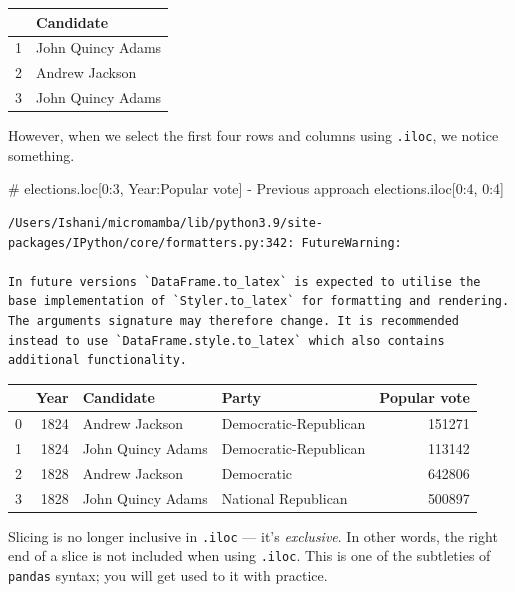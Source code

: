 \documentclass[
  letterpaper,
  DIV=11,
  numbers=noendperiod]{scrreprt}
\newenvironment{Shaded}{\begin{snugshade}}{\end{snugshade}}
\newcommand{\CommentTok}[1]{\textcolor[rgb]{0.37,0.37,0.37}{#1}}
\newcommand{\DecValTok}[1]{\textcolor[rgb]{0.68,0.00,0.00}{#1}}
\newcommand{\NormalTok}[1]{\textcolor[rgb]{0.00,0.23,0.31}{#1}}
\begin{document}
\begin{tabular}{ll}
\toprule
{} &          Candidate \\
\midrule
1 &  John Quincy Adams \\
2 &     Andrew Jackson \\
3 &  John Quincy Adams \\
\bottomrule
\end{tabular}

However, when we select the first four rows and columns using
\texttt{.iloc}, we notice something.

\begin{Shaded}
\begin{Highlighting}[]
\CommentTok{\# elections.loc[0:3, \textquotesingle{}Year\textquotesingle{}:\textquotesingle{}Popular vote\textquotesingle{}] {-} Previous approach}
\NormalTok{elections.iloc[}\DecValTok{0}\NormalTok{:}\DecValTok{4}\NormalTok{, }\DecValTok{0}\NormalTok{:}\DecValTok{4}\NormalTok{]}
\end{Highlighting}
\end{Shaded}

\begin{verbatim}
/Users/Ishani/micromamba/lib/python3.9/site-packages/IPython/core/formatters.py:342: FutureWarning:

In future versions `DataFrame.to_latex` is expected to utilise the base implementation of `Styler.to_latex` for formatting and rendering. The arguments signature may therefore change. It is recommended instead to use `DataFrame.style.to_latex` which also contains additional functionality.
\end{verbatim}

\begin{tabular}{lrllr}
\toprule
{} &  Year &          Candidate &                  Party &  Popular vote \\
\midrule
0 &  1824 &     Andrew Jackson &  Democratic-Republican &        151271 \\
1 &  1824 &  John Quincy Adams &  Democratic-Republican &        113142 \\
2 &  1828 &     Andrew Jackson &             Democratic &        642806 \\
3 &  1828 &  John Quincy Adams &    National Republican &        500897 \\
\bottomrule
\end{tabular}

Slicing is no longer inclusive in \texttt{.iloc} --- it's
\emph{exclusive}. In other words, the right end of a slice is not
included when using \texttt{.iloc}. This is one of the subtleties of
\texttt{pandas} syntax; you will get used to it with practice.
\end{document}
